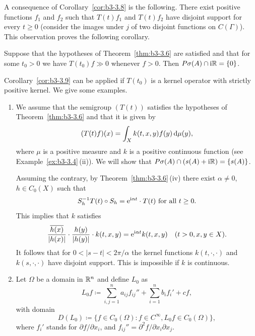 A consequence of Corollary~\ref{cor:b3-3.8} is the following. 
There exist positive functions $f_{1}$ and $f_{2}$ such that $T(t)f_{1}$ and $T(t)f_{2}$ have disjoint support for every $t \geq 0$ (consider the images under $j$ of two disjoint functions on $C(\Gamma)$).
This observation proves the following corollary.
\begin{corollary}\label{cor:b3-3.9}

	Suppose that the hypotheses of Theorem~\ref{thm:b3-3.6} are satisfied and that for some $t_{0} > 0$ we have $T(t_{0})f \gg 0$ whenever $f > 0$.
	Then $P\sigma(A)\cap \mathrm{i}\mathbb{R} = \{0\}$.
\end{corollary}
Corollary~\ref{cor:b3-3.9} can be applied if\/ $T(t_{0})$ is a kernel operator%
with strictly positive kernel.
We give some examples.
\begin{examples}\label{ex:b3-3.10}
%
	
	\begin{enumerate}[\upshape (i), wide, labelindent=.25em] 
	\item 
	We assume that the semigroup $(T(t))$ satisfies the hypotheses of Theorem~\ref{thm:b3-3.6} and that it is given by
	\[
	(T(t)f)(x) = \int_{X} k(t,x,y)f(y) \mathop{}\!\mathrm{d}{\mu}(y) , 
	\]
	where $\mu$ is a positive measure and $k$ is a positive continuous function (see Example~\ref{ex:b3-3.4}\,(ii)).
	We will show that $P\sigma(A)\cap(s(A) + \mathrm{i}\mathbb{R}) = \{s(A)\}$.
	
	Assuming the contrary, by Theorem~\ref{thm:b3-3.6}\,(iv) there exist $\alpha \neq 0$, $h \in C_{0}(X)$ such that
	\begin{equation}\label{eq:b3-3.10}
	S_{h}^{-1}T(t)\circ S_{h} = \eu^{\im\alpha t}\cdot T(t) \text{ for all } t \geq 0.
	\end{equation}
	This implies that $k$ satisfies
	\begin{equation}\label{eq:b3-3.11}
	\frac{\overline{h(x)}}{|h(x)|}\cdot\frac{h(y)}{|h(y)|}\cdot k(t,x,y) = \mathrm{e}^{\mathrm{i}\alpha t}k(t,x,y) \quad (t > 0, x,y \in X).
	\end{equation}
	It follows that for $0 < |s-t| < 2\pi/\alpha$ the kernel functions  $k(t,\cdot,\cdot)$ and $k(s,\cdot,\cdot)$ have disjoint support.
	This is impossible if\/ $k$ is continuous.
	
	\item 
	Let $\Omega$ be a domain in $\mathbb{R}^{n}$ and define $L_{0}$ as
	\[
	L_{0}f \coloneq \sum_{i,j=1}^{n} a_{ij}f_{ij}'' + \sum_{i=1}^{n}b_{i}f_{i}' + cf , 
	\]
	with domain 
    \[
    D(L_{0}) \coloneq \{f \in C_{0}(\Omega) \colon f \in  C^{\infty}, L_{0}f \in C_{0}(\Omega)\} , 
    \]
	where $f_{i}'$ stands for $\partial f/\partial x_{i}$, and $f_{ij}'' = \partial^{2}f/\partial x_{i}\partial x_{j}$.
	

\end{enumerate}
\end{examples}
